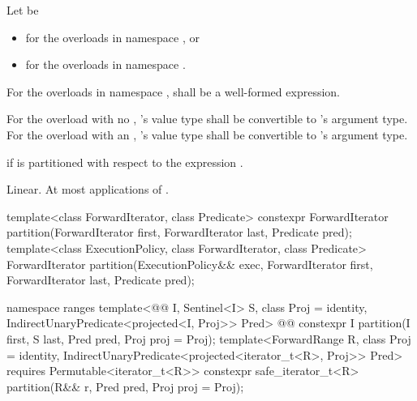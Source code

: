 \begin{itemdescr}
\begin{addedblock}
\pnum
Let  be
\begin{itemize}
\item {} for the overloads in namespace , or
\item {} for the overloads in
  namespace .
\end{itemize}

\pnum
\requires
For the overloads in namespace ,
 shall be a well-formed expression.
\end{addedblock}

\begin{removedblock}
\pnum
\requires For the overload with no ,
's value type shall be convertible to 's
argument type.  For the overload with an ,
's value type shall be convertible to 's
argument type.
\end{removedblock}

\pnum
\returns {} if 
 is  partitioned with respect to the expression
 .

\pnum
\complexity Linear. At most  applications of 
.
\end{itemdescr}


%
\begin{itemdecl}
template<class ForwardIterator, class Predicate>
  constexpr ForwardIterator
    partition(ForwardIterator first, ForwardIterator last, Predicate pred);
template<class ExecutionPolicy, class ForwardIterator, class Predicate>
  ForwardIterator
    partition(ExecutionPolicy&& exec,
              ForwardIterator first, ForwardIterator last, Predicate pred);
\end{itemdecl}
\begin{addedblock}
\begin{itemdecl}
namespace ranges {
  template<@@ I, Sentinel<I> S, class Proj = identity,
      IndirectUnaryPredicate<projected<I, Proj>> Pred>
    @@
    constexpr I
      partition(I first, S last, Pred pred, Proj proj = Proj{});
  template<ForwardRange R, class Proj = identity,
      IndirectUnaryPredicate<projected<iterator_t<R>, Proj>> Pred>
    requires Permutable<iterator_t<R>>
    constexpr safe_iterator_t<R>
      partition(R&& r, Pred pred, Proj proj = Proj{});
}
\end{itemdecl}
\end{addedblock}

